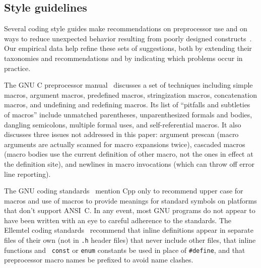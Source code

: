 \documentclass[10pt]{article}
\newcommand{\file}[1]{\texttt{#1}}
\begin{document}
\subsection{Style guidelines}

Several coding style guides make recommendations on preprocessor use and on
ways to reduce unexpected behavior resulting from poorly designed
constructs~\cite{Cannon90}.  Our empirical data help refine these sets of
suggestions, both by extending their taxonomies and recommendations and by
indicating which problems occur in practice.

The GNU C preprocessor manual~\cite{cpp-manual} discusses
a set of techniques including simple macros, argument macros, predefined
macros, stringization macros, concatenation macros, and undefining and
redefining macros.  Its list of ``pitfalls and subtleties of macros'' include
unmatched parentheses, unparenthesized formals and bodies, dangling
semicolons, multiple formal uses, and self-referential macros.  It also
discusses three issues not addressed in this paper:  argument prescan
(macro arguments are actually scanned for macro expansions twice), cascaded
macros (macro bodies use the current definition of other macro, not the
ones in effect at the definition site), and newlines in macro invocations
(which can throw off error line reporting).

The GNU coding standards~\cite{Stallman97} mention Cpp only to recommend
upper case for macros and use of macros to provide meanings for standard
symbols on platforms that don't support ANSI~C\@.
In any event, most GNU programs do not appear to have been written with
an eye to careful adherence to the standards.
The Ellemtel coding standards~\cite{ellemtel92} recommend that inline
definitions appear in separate files of their own (not in \file{.h} header
files) that never include other files, that inline functions and {\tt
const} or {\tt enum} constants be used in place of {\tt \#define}, and that
preprocessor macro names be prefixed to avoid name clashes.
\end{document}
